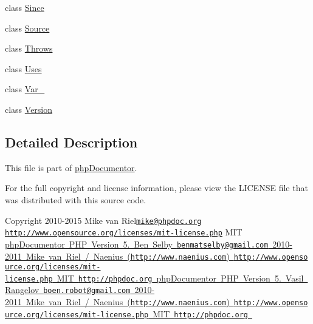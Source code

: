 \begin{DoxyCompactItemize}
class \mbox{\hyperlink{classphp_documentor_1_1_reflection_1_1_doc_block_1_1_tags_1_1_since}{Since}}
\item 
class \mbox{\hyperlink{classphp_documentor_1_1_reflection_1_1_doc_block_1_1_tags_1_1_source}{Source}}
\item 
class \mbox{\hyperlink{classphp_documentor_1_1_reflection_1_1_doc_block_1_1_tags_1_1_throws}{Throws}}
\item 
class \mbox{\hyperlink{classphp_documentor_1_1_reflection_1_1_doc_block_1_1_tags_1_1_uses}{Uses}}
\item 
class \mbox{\hyperlink{classphp_documentor_1_1_reflection_1_1_doc_block_1_1_tags_1_1_var__}{Var\+\_\+}}
\item 
class \mbox{\hyperlink{classphp_documentor_1_1_reflection_1_1_doc_block_1_1_tags_1_1_version}{Version}}
\end{DoxyCompactItemize}


\subsection{Detailed Description}
This file is part of \mbox{\hyperlink{namespacephp_documentor}{php\+Documentor}}.

For the full copyright and license information, please view the L\+I\+C\+E\+N\+SE file that was distributed with this source code.

\begin{DoxyCopyright}{Copyright}
2010-\/2015 Mike van Riel\href{mailto:mike@phpdoc.org}{\tt mike@phpdoc.\+org}  \href{http://www.opensource.org/licenses/mit-license.php}{\tt http\+://www.\+opensource.\+org/licenses/mit-\/license.\+php} M\+IT \mbox{\hyperlink{}{php\+Documentor P\+HP Version 5.  Ben Selby \href{mailto:benmatselby@gmail.com}{\tt benmatselby@gmail.\+com}  2010-\/2011 Mike van Riel / Naenius (\href{http://www.naenius.com}{\tt http\+://www.\+naenius.\+com})  \href{http://www.opensource.org/licenses/mit-license.php}{\tt http\+://www.\+opensource.\+org/licenses/mit-\/license.\+php} M\+IT  \href{http://phpdoc.org}{\tt http\+://phpdoc.\+org} php\+Documentor P\+HP Version 5.  Vasil Rangelov \href{mailto:boen.robot@gmail.com}{\tt boen.\+robot@gmail.\+com}  2010-\/2011 Mike van Riel / Naenius (\href{http://www.naenius.com}{\tt http\+://www.\+naenius.\+com})  \href{http://www.opensource.org/licenses/mit-license.php}{\tt http\+://www.\+opensource.\+org/licenses/mit-\/license.\+php} M\+IT  \href{http://phpdoc.org}{\tt http\+://phpdoc.\+org} }}
\end{DoxyCopyright}
